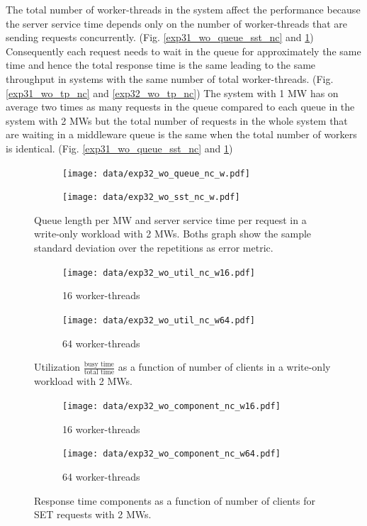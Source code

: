 \documentclass[report.tex]{subfiles}
\begin{document}
The total number of worker-threads in the system affect the performance because the server service time depends only on the number of worker-threads that are sending requests concurrently. (Fig. \ref{exp31_wo_queue_sst_nc} and \ref{exp32_wo_queue_sst_nc})
Consequently each request needs to wait in the queue for approximately the same time and hence the total response time is the same leading to the same throughput in systems with the same number of total worker-threads. (Fig. \ref{exp31_wo_tp_nc} and \ref{exp32_wo_tp_nc})
The system with 1 MW has on average two times as many requests in the queue compared to each queue in the system with 2 MWs 
but the total number of requests in the whole system that are waiting in a middleware queue is the same when the total number of workers is identical. (Fig. \ref{exp31_wo_queue_sst_nc} and \ref{exp32_wo_queue_sst_nc})
\vspace{-2mm}

\begin{figure}[H]
	\begin{subfigure}[b]{.499\linewidth}
		\centering
		\texttt{[image: data/exp32\_wo\_queue\_nc\_w.pdf]}
	\end{subfigure}\hfill
	\begin{subfigure}[b]{.499\linewidth}
		\centering
		\texttt{[image: data/exp32\_wo\_sst\_nc\_w.pdf]}
	\end{subfigure}\hfill
	\caption{Queue length per MW and server service time per request in a write-only workload with 2 MWs. Boths graph show the sample standard deviation over the repetitions as error metric.}\label{exp32_wo_queue_sst_nc}
\end{figure}

\begin{figure}[H]
	\begin{subfigure}[b]{.499\linewidth}
		\centering
		\texttt{[image: data/exp32\_wo\_util\_nc\_w16.pdf]}
		\caption{16 worker-threads}
	\end{subfigure}\hfill
	\begin{subfigure}[b]{.499\linewidth}
		\centering
		\texttt{[image: data/exp32\_wo\_util\_nc\_w64.pdf]}
		\caption{64 worker-threads}
	\end{subfigure}\hfill
	\caption{Utilization $\frac{\text{busy time}}{\text{total time}}$ as a function of number of clients in a write-only workload with 2 MWs.}\label{exp32_wo_util_nc}
\end{figure}

\begin{figure}[H]
	\begin{subfigure}[b]{.499\linewidth}
		\centering
		\texttt{[image: data/exp32\_wo\_component\_nc\_w16.pdf]}
		\caption{16 worker-threads}
	\end{subfigure}\hfill
	\begin{subfigure}[b]{.499\linewidth}
		\centering
		\texttt{[image: data/exp32\_wo\_component\_nc\_w64.pdf]}
		\caption{64 worker-threads}
	\end{subfigure}\hfill
	\caption{Response time components as a function of number of clients for SET requests with 2 MWs.}\label{exp32_wo_rtcomp_nc}
\end{figure}
\end{document}
